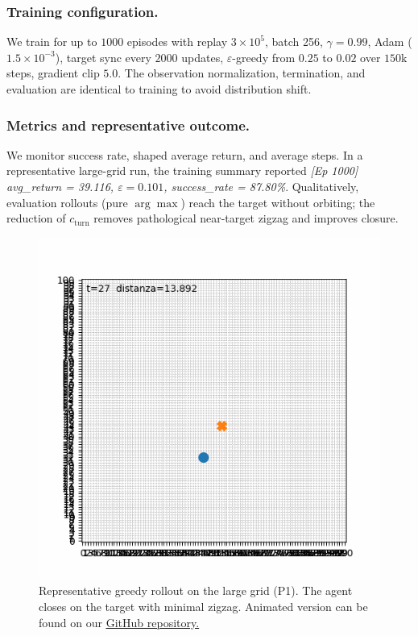         \subsubsection{Training configuration.}
            We train for up to $1000$ episodes with replay $3\!\times\!10^5$, batch 256, $\gamma=0.99$, Adam ($1.5\!\times\!10^{-3}$), target sync every $2000$ updates, $\varepsilon$-greedy from $0.25$ to $0.02$ over $150$k steps, gradient clip $5.0$.
            The observation normalization, termination, and evaluation are identical to training to avoid distribution shift.
        
        \subsubsection{Metrics and representative outcome.}
            We monitor success rate, shaped average return, and average steps. In a representative large-grid run, the training summary reported 
            \emph{[Ep 1000] avg\_return = 39.116, $\varepsilon=0.101$, success\_rate = 87.80\%}.%
            Qualitatively, evaluation rollouts (pure $\arg\max$) reach the target without orbiting; the reduction of $c_{\mathrm{turn}}$ removes pathological near-target zigzag and improves closure.

            \begin{figure}[H]
                \centering
                \includegraphics[scale=0.5]{Figures/step_2_t2.png}
                \caption{Representative greedy rollout on the large grid (P1). The agent closes on the target with minimal zigzag. Animated version can be found on our \underline{\href{https://github.com/rolandoinnamorati/swarm-rl}{GitHub repository.}}}
            \end{figure}

